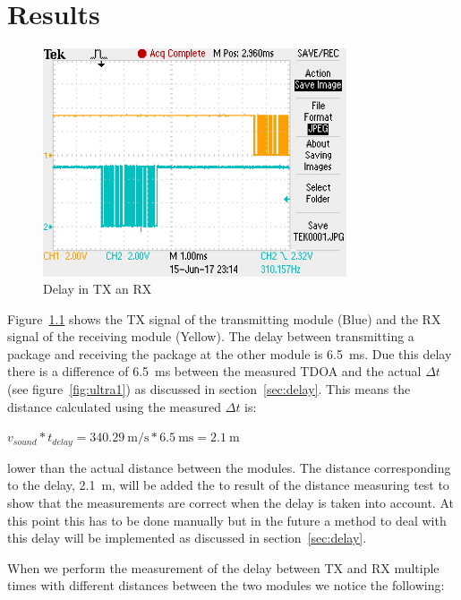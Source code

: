 \chapter{Results}
\label{chap:results}

\begin{figure}[H]
\centering
\includegraphics[width=0.8\textwidth]{Figures/delay_tx_rx.JPG}
\caption{Delay in TX an RX}
\label{fig:delay_tx_rx}
\end{figure}


Figure~\ref{fig:delay_tx_rx} shows the TX signal of the transmitting module (Blue) and the RX signal of the receiving module (Yellow).
The delay between transmitting a package and receiving the package at the other module is \SI{6.5}{\milli\second}.
Due this delay there is a difference of \SI{6.5}{\milli\second} between the measured TDOA and the actual $\Delta t$ (see figure~\ref{fig:ultra1}) as discussed in section~\ref{sec:delay}.
This means the distance calculated using the measured $\Delta t$ is:

$ v_{sound} * t_{delay} = \SI{340.29}{\meter\per\second} * \SI{6.5}{\milli\second} = \SI{2.1}{\meter} $

lower than the actual distance between the modules.
The distance corresponding to the delay, \SI{2.1}{\meter}, will be added the to result of the distance measuring test to show that the measurements are correct when the delay is taken into account.
At this point this has to be done manually but in the future a method to deal with this delay will be implemented as discussed in section~\ref{sec:delay}.

When we perform the measurement of the delay between TX and RX multiple times with different distances between the two modules we notice the following:

